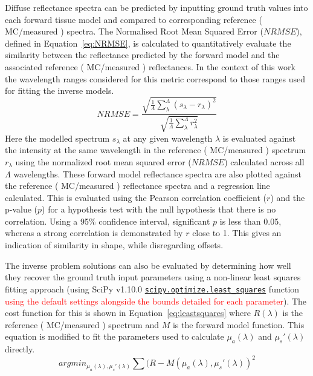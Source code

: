 Diffuse reflectance spectra can be predicted by inputting ground truth values into each forward tissue model and compared to corresponding reference (%
MC/measured%
) spectra. The Normalised Root Mean Squared Error ($NRMSE$), defined in Equation~\eqref{eq:NRMSE}, is calculated to quantitatively evaluate the similarity between the reflectance predicted by the forward model and the associated reference (
MC/measured%
) reflectances. In the context of this work the wavelength ranges considered for this metric correspond to those ranges used for fitting the inverse models.
\begin{equation}
    NRMSE = \frac{\sqrt{\frac{1}{\Lambda}\sum_{\lambda}^{\Lambda}\left(s_{\lambda} - r_{\lambda}\right)^2}}{\sqrt{\frac{1}{\Lambda}\sum_{\lambda}^{\Lambda} r^2_{\lambda}}}
    \label{eq:NRMSE}
\end{equation}
Here the modelled spectrum $s_{\lambda}$ at any given wavelength $\lambda$ is evaluated against the intensity at the same wavelength in the reference (
MC/measured
) spectrum $r_{\lambda}$ using the normalized root mean squared error ($NRMSE$) calculated across all $\Lambda$ wavelengths. These forward model reflectance spectra are also plotted against the reference (
MC/measured
) reflectance spectra and a regression line calculated. This is evaluated using the Pearson correlation coefficient ($r$) and the p-value ($p$) for a hypothesis test with the null hypothesis that there is no correlation. Using a 95\% confidence interval, significant $p$ is less than 0.05, whereas a strong correlation is demonstrated by $r$ close to 1.  This gives an indication of similarity in shape, while disregarding offsets.

The inverse problem solutions can also be evaluated by determining how well they recover the ground truth input parameters using a non-linear least squares fitting approach (using SciPy v1.10.0 \href{https://docs.scipy.org/doc/scipy/reference/generated/scipy.optimize.least_squares.html}{\texttt{scipy.optimize.least\_squares}} function \textcolor{red}{using the default settings alongside the bounds detailed for each parameter}). The cost function for this is shown in Equation~\eqref{eq:leastsquares} where $R(\lambda)$ is the reference (
MC/measured
) spectrum and $M$ is the forward model function. This equation is modified to fit the parameters used to calculate $\mu_a(\lambda)$ and $\mu_s'(\lambda)$ directly.
\begin{equation}
    argmin_{\mu_{a}(\lambda), \mu_{s}'(\lambda)} \sum (R - M(\mu_{a}(\lambda), \mu_s'(\lambda))^2
    \label{eq:leastsquares}
\end{equation}

